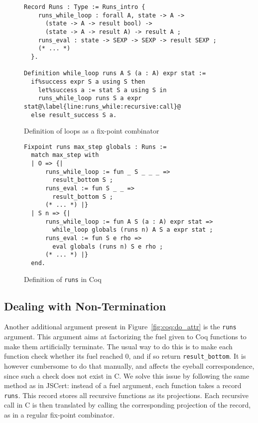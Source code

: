\documentclass[
    sigplan,
    10pt,
    review, %
    natbib=false %
 ]{acmart}
\begin{document}
\begin{figure}
\begin{verbatim}
Record Runs : Type := Runs_intro {
    runs_while_loop : forall A, state -> A ->
      (state -> A -> result bool) ->
      (state -> A -> result A) -> result A ;
    runs_eval : state -> SEXP -> SEXP -> result SEXP ;
    (* ... *)
  }.

Definition while_loop runs A S (a : A) expr stat :=
  if%success expr S a using S then
    let%success a := stat S a using S in
    runs_while_loop runs S a expr stat@\label{line:runs_while:recursive:call}@
  else result_success S a.
\end{verbatim}
\vspace{-1em}
    \caption{Definition of loops as a fix-point combinator}
    \label{fig:while_loop}
\end{figure}

\begin{figure}
\begin{verbatim}
Fixpoint runs max_step globals : Runs :=
  match max_step with
  | O => {|
      runs_while_loop := fun _ S _ _ _ =>
        result_bottom S ;
      runs_eval := fun S _ _ =>
        result_bottom S ;
      (* ... *) |}
  | S n => {|
      runs_while_loop := fun A S (a : A) expr stat =>
        while_loop globals (runs n) A S a expr stat ;
      runs_eval := fun S e rho =>
        eval globals (runs n) S e rho ;
      (* ... *) |}
  end.
\end{verbatim}
\vspace{-1em}
    \caption{Definition of \texttt{runs} in Coq}
    \label{fig:runs}
\end{figure}

\subsection{Dealing with Non-Termination}
\label{sec:fuel}

Another additional argument present in Figure~\ref{fig:coq:do_attr}
is the \texttt{runs} argument.
This argument aims at factorizing the fuel given to Coq functions
to make them artificially terminate.
The usual way to do this is to make each function check whether its fuel
reached \(0\), and if so return \texttt{result_bottom}.
It is however cumbersome to do that manually, and affects the eyeball correspondence, since such a check does not exist in C.
%
We solve this issue by following the same method as in JSCert:
instead of a fuel argument, each function takes a record \texttt{runs}.
This record stores all recursive functions as its projections.
Each recursive call in C is then translated by calling
the corresponding projection of the record,
as in a regular fix-point combinator.
\end{document}

